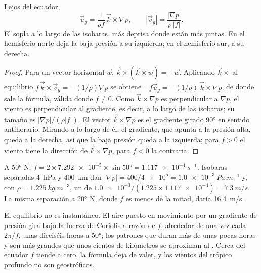 \begin{theorem}\label{thm:b1:atmospheric-circulation:geostrophic}
Lejos del ecuador,
\[
  \vec v_g = \frac{1}{\rho f}\,\vec k\times\nabla p, \qquad
  |\vec v_g| = \frac{|\nabla p|}{\rho\,|f|} .
\]
El  sopla a lo largo de las isobaras, más deprisa donde están más juntas.
En el hemisferio norte deja la baja presión a su izquierda; en el hemisferio sur, a su derecha.
\end{theorem}

\begin{proof}
Para un vector horizontal $\vec w$, $\vec k\times(\vec k\times\vec w) = -\vec w$.
Aplicando $\vec k\times$ al equilibrio $f\,\vec k\times\vec v_g = -(1/\rho)\nabla p$
se obtiene $-f\vec v_g = -(1/\rho)\,\vec k\times\nabla p$, de donde sale la fórmula, válida donde
$f \neq 0$. Como $\vec k\times\nabla p$ es perpendicular a $\nabla p$, el viento es perpendicular al gradiente, es decir, a lo largo de las isobaras; su tamaño es $|\nabla
p|/(\rho|f|)$. El vector $\vec k\times\nabla p$ es el gradiente girado \ang{90} en sentido antihorario. Mirando a lo largo de él, el gradiente, que apunta a la presión alta, queda a la derecha, así que la baja presión queda a la izquierda; para $f > 0$ el viento tiene la dirección de $\vec k\times\nabla p$, para $f < 0$ la contraria.
\end{proof}

\begin{example}\label{ex:b1:atmospheric-circulation:geostrophic}
A \ang{50} N, $f = 2 \times \num{7.292e-5} \times \sin\ang{50} = \qty{1.117e-4}{s^{-1}}$.
Isobaras separadas \qty{4}{hPa} y \qty{400}{km} dan $|\nabla p| = 400/\num{4e5} =
\qty{1.0e-3}{Pa.m^{-1}}$ y, con $\rho = \qty{1.225}{kg.m^{-3}}$, un  de
$\num{1.0e-3}/(1.225 \times \num{1.117e-4}) = \qty{7.3}{m/s}$. La misma separación a \ang{20} N, donde $f$ es menos de la mitad, daría
\qty{16.4}{m/s}.
\end{example}

El equilibrio no es instantáneo. El aire puesto en movimiento por un gradiente de presión gira bajo la fuerza de Coriolis a razón de $f$, alrededor de una vez cada $2\pi/f$, unas dieciséis horas a \ang{50}; los patrones que duran más de unas pocas horas y son más grandes que unos cientos de kilómetros se aproximan al . Cerca del ecuador $f$ tiende a cero, la fórmula deja de valer, y los vientos del trópico profundo no son geostróficos.

